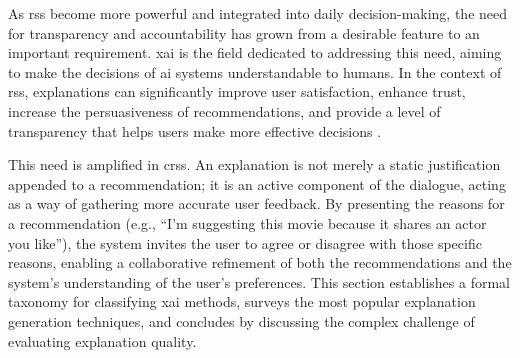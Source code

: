 As \aclp{rs} become more powerful and integrated into daily decision-making, the need for transparency and accountability has grown from a desirable feature to an important requirement. \acl{xai} is the field dedicated to addressing this need, aiming to make the decisions of \ac{ai} systems understandable to humans. In the context of \acp{rs}, explanations can significantly improve user satisfaction, enhance trust, increase the persuasiveness of recommendations, and provide a level of transparency that helps users make more effective decisions \cite{SOTA-RECSYS-EXPLAIN}.

This need is amplified in \aclp{crs}. An explanation is not merely a static justification appended to a recommendation; it is an active component of the dialogue, acting as a way of gathering more accurate user feedback. By presenting the reasons for a recommendation (e.g., ``I'm suggesting this movie because it shares an actor you like''), the system invites the user to agree or disagree with those specific reasons, enabling a collaborative refinement of both the recommendations and the system's understanding of the user's preferences. This section establishes a formal taxonomy for classifying \ac{xai} methods, surveys the most popular explanation generation techniques, and concludes by discussing the complex challenge of evaluating explanation quality.
